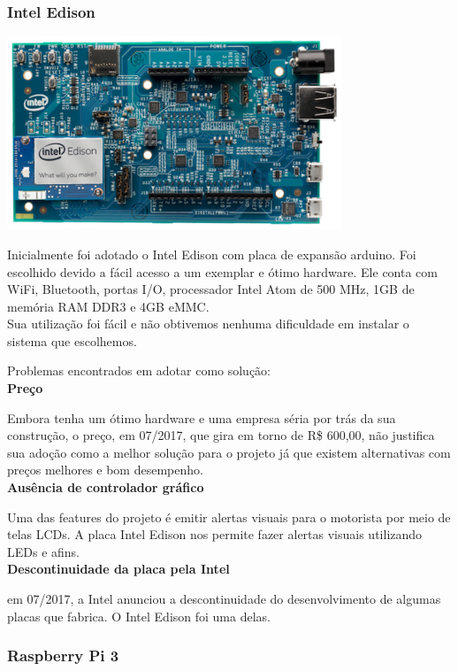 \documentclass[
	12pt,				%
	oneside,			%
	a4paper,			%
	brazil				%
]{abntex2}
\begin{document}
\subsubsection{Intel Edison}

\includegraphics[width=10cm, center]{images/intel-edison-arduino-kit}

Inicialmente foi adotado o Intel Edison com placa de expansão arduino. Foi escolhido devido a fácil acesso a um exemplar e ótimo hardware. Ele conta com WiFi, Bluetooth, portas I/O, processador Intel Atom de 500 MHz, 1GB de memória RAM DDR3 e 4GB eMMC. \\
Sua utilização foi fácil e não obtivemos nenhuma dificuldade em instalar o sistema que escolhemos.


Problemas encontrados em adotar como solução:
\\

\textbf{Preço}

Embora tenha um ótimo hardware e uma empresa séria por trás da sua construção, o preço, em 07/2017, que gira em torno de R\$ 600,00, não justifica sua adoção como a melhor solução para o projeto já que existem alternativas com preços melhores e bom desempenho.
\\

\textbf{Ausência de controlador gráfico}

Uma das features do projeto é emitir alertas visuais para o motorista por meio de telas LCDs. A placa Intel Edison nos permite fazer alertas visuais utilizando LEDs e afins. 
\\

\textbf{Descontinuidade da placa pela Intel}

em 07/2017, a Intel anunciou a descontinuidade do desenvolvimento de algumas placas que fabrica. O Intel Edison foi uma delas.

\subsubsection{Raspberry Pi 3}
\end{document}
